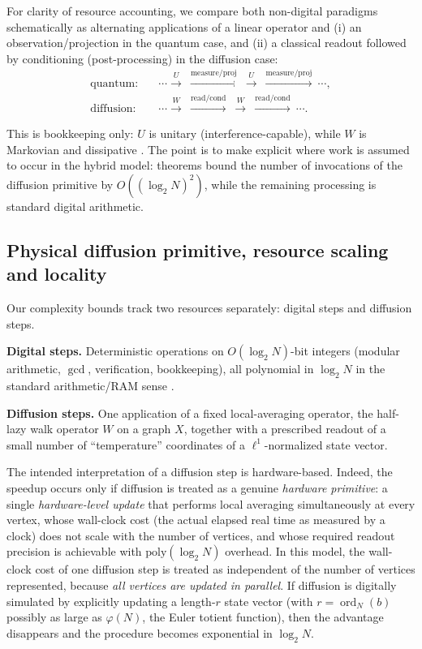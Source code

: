 \documentclass[11pt,reqno]{article}
\numberwithin{equation}{section}
\DeclareMathOperator{\ord}{ord}
\theoremstyle{plain}
\theoremstyle{definition}
\theoremstyle{remark}
\newcommand{\poly}{\mathrm{poly}}
\begin{document}
For clarity of resource accounting, we compare both non-digital paradigms schematically as alternating
applications of a linear operator and (i) an observation/projection in the quantum case,
and (ii) a classical readout followed by conditioning (post-processing) in the diffusion case:
\[
\begin{aligned}
\text{quantum:}\quad &\cdots \xrightarrow{U}\ \xrightarrow{\text{measure/proj}}\ \xrightarrow{U}\ \xrightarrow{\text{measure/proj}}\ \cdots,\\
\text{diffusion:}\quad &\cdots \xrightarrow{W}\ \xrightarrow{\text{read/cond}}\ \xrightarrow{W}\ \xrightarrow{\text{read/cond}}\ \cdots.
\end{aligned}
\]

This is bookkeeping only: $U$ is unitary (interference-capable), while $W$ is Markovian and dissipative \cite{NC10,LPW09}.
The point is to make explicit where work is assumed to occur in the hybrid model: theorems bound the number of invocations of the diffusion primitive by
$O((\log_2 N)^2)$, while the remaining processing is standard digital arithmetic.


\subsection{Physical diffusion primitive, resource scaling and locality}
Our complexity bounds track two resources separately: digital steps and diffusion steps.

\medskip
\noindent\textbf{Digital steps.}
Deterministic operations on $O(\log_2 N)$-bit integers (modular arithmetic, $\gcd$, verification, bookkeeping), all polynomial in $\log_2 N$ in the standard arithmetic/RAM sense \cite{Knuth2,BachShallit}.

\medskip
\noindent\textbf{Diffusion steps.}
One application of a fixed local-averaging operator, the half-lazy walk operator $W$ on a graph $X$, together with a prescribed readout of a small number of ``temperature'' coordinates of a $\ell^1$-normalized state vector.

The intended interpretation of a diffusion step is hardware-based. Indeed, the speedup occurs only if diffusion is treated as a genuine \emph{hardware primitive}: a single \emph{hardware-level update} that performs local averaging simultaneously at every vertex,
whose wall-clock cost (the actual elapsed real time as measured by a clock) does not scale with the
number of vertices, and whose required readout precision is achievable with $\poly(\log_2 N)$ overhead. In this model, the wall-clock cost of one diffusion step is treated as independent of the
number of vertices represented, because \emph{all vertices are updated in parallel}.
If diffusion is digitally simulated by explicitly updating a length-$r$ state vector (with
$r=\ord_N(b)$ possibly as large as $\varphi(N)$, the Euler totient function), then the advantage disappears and the procedure becomes exponential in $\log_2 N$.
\end{document}
